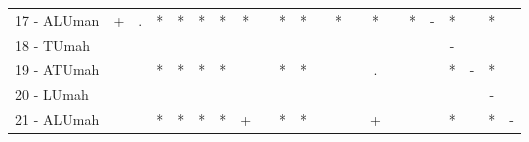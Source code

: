\begin{table}[h]
\begin{center}
\begin{tabular}{lcc|cc|cc|cc|cc|cc|cc|cc|cc|cc|c}
17 - ALUman	& + & . & * & * & * & * & * &   & * & * &   & * &   & * &   & * & - & * &   & * &   \\
18 - TUmah	&   &   &   &   &   &   &   &   &   &   &   &   &   &   &   &   &   & - &   &   &   \\ \hline
19 - ATUmah	&   &   & * & * & * & * &   &   & * & * &   &   &   & . &   &   &   & * & - & * &   \\
20 - LUmah	&   &   &   &   &   &   &   &   &   &   &   &   &   &   &   &   &   &   &   & - &   \\ \hline
21 - ALUmah	&   &   & * & * & * & * & + &   & * & * &   &   &   & + &   &   &   & * &   & * & - \\\end{tabular}
\label{stratsALCKappaFriedVFDT}
\end{center}
\end{table}